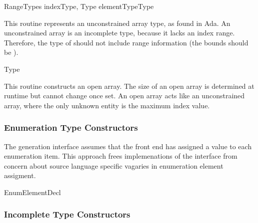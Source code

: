 	{RangeTypes indexType, Type elementType}{Type}
\begin{functionality}
This routine represents an unconstrained array type, as found in Ada.
An unconstrained array is an incomplete type, because it lacks an
index range.  Therefore, the type of  should not
include range information (\ie the bounds should be ).  
\end{functionality}

	{Type}
\begin{functionality}
This routine constructs an open array.  The size of an open array is
determined at runtime but cannot change once set.  An open array acts
like an unconstrained array, where the only unknown entity is the
maximum index value.  
\end{functionality}

\subsubsection{Enumeration Type Constructors}
The generation interface assumes that the front end has assigned a
value to each enumeration item.  This approach frees 
implemenations of the interface from concern about source language
specific vagaries in enumeration element assigment.

	{EnumElementDecl}

\begin{functionality}
\end{functionality}


\subsubsection{Incomplete Type Constructors}

